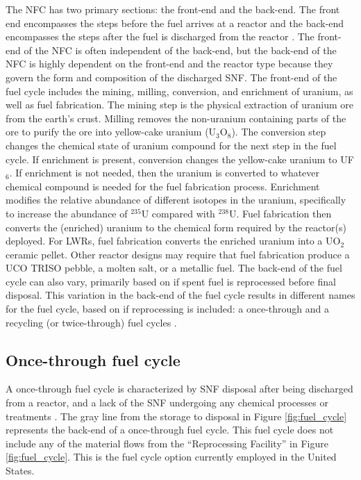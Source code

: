 The \acrfull{NFC} has two primary sections: the front-end and 
the back-end. 
The front end encompasses the steps before the fuel arrives at a reactor 
and the back-end encompasses the steps after the fuel is discharged 
from the reactor \cite{rodriguez-penalonga_review_2017}. The front-end of 
the \gls{NFC} is often independent of the back-end, but the back-end 
of the \gls{NFC} is highly dependent on the front-end and the reactor 
type because they govern the form and composition of the discharged 
\acrfull{SNF}. The front-end of the fuel cycle includes the mining, 
milling, conversion, and enrichment of uranium, as well as 
fuel fabrication. The mining step is the physical extraction of uranium 
ore from the earth's crust. Milling removes the non-uranium containing 
parts of the ore to purify the ore into yellow-cake uranium (U$_3$O$_8$).
The conversion step changes the chemical state of uranium compound 
for the next step in the fuel cycle. If enrichment is present, conversion 
changes the yellow-cake uranium to UF$_6$. If enrichment is not 
needed, then the uranium is converted to whatever chemical compound is 
needed for the fuel fabrication process. Enrichment modifies the 
relative abundance of different isotopes in the uranium, specifically 
to increase the abundance of $^{235}$U compared with $^{238}$U. Fuel 
fabrication then converts the (enriched) uranium to the chemical 
form required by the reactor(s) deployed. For \glspl{LWR}, fuel 
fabrication converts the enriched uranium into a UO$_2$ ceramic 
pellet. Other reactor designs may require that fuel fabrication 
produce a UCO \gls{TRISO} pebble, a molten salt, or a metallic fuel. 
The back-end of the fuel cycle can also vary, primarily based on if spent 
fuel is reprocessed before final disposal. This variation in the 
back-end of the fuel cycle results in different names for the fuel 
cycle, based on if reprocessing is included: a once-through and a recycling 
(or twice-through) fuel cycles \cite{tsoulfanidis_nuclear_2013}. 

\subsection{Once-through fuel cycle}
A once-through fuel cycle is characterized by \gls{SNF} disposal
after being discharged from a reactor, and a lack of the 
\gls{SNF} undergoing any chemical processes 
or treatments \cite{rodriguez-penalonga_review_2017}. The gray line from 
the storage to disposal in Figure \ref{fig:fuel_cycle} represents 
the back-end of a once-through fuel cycle. This fuel cycle does 
not include any of the material flows from the ``Reprocessing Facility'' 
in Figure \ref{fig:fuel_cycle}.
This is the fuel cycle option currently employed in the 
United States. 

